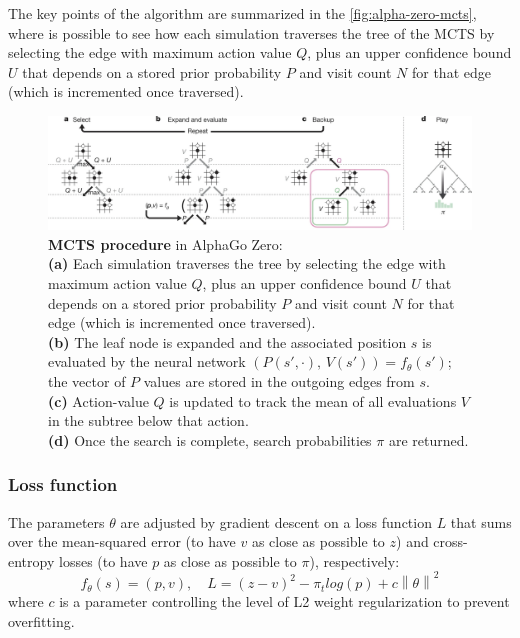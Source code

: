 \documentclass{article}
\newcommand{\norm}[1]{\left\lVert#1\right\rVert}
\begin{document}
The key points of the algorithm are summarized in the \autoref{fig:alpha-zero-mcts}, where is possible to see how each simulation traverses the tree of the MCTS by selecting the edge with maximum action value $Q$, plus an upper confidence bound $U$ that depends on a stored prior probability $P$ and visit count $N$ for that edge (which is incremented once traversed).
\begin{figure}[H]
	\centerline{\includegraphics[width=15cm]{alpha-zero-mcts.png}}
	\caption{\textbf{MCTS procedure} in AlphaGo Zero\cite{Silver_2016}:\\ \textbf{(a)} Each simulation traverses the tree by selecting the edge with maximum action value $Q$, plus an upper confidence bound $U$ that depends on a stored prior probability $P$ and visit count $N$ for that edge (which is incremented once traversed).\\ \textbf{(b)} The leaf node is expanded and the associated position $s$ is evaluated by the neural network $(P(s', \cdot), \, V(s')) = f_\theta(s')$; the vector of $P$ values are stored in the outgoing edges from $s$.\\ \textbf{(c)} Action-value $Q$ is updated to track the mean of all evaluations $V$ in the subtree below that action.\\ \textbf{(d)} Once the search is complete, search probabilities $\pi$ are returned.}
	\label{fig:alpha-zero-mcts}
\end{figure}

\subsubsection{Loss function}
The parameters $\theta$ are adjusted by gradient descent on a loss function $L$ that sums over the mean-squared error (to have $v$ as close as possible to $z$) and cross-entropy losses (to have $p$ as close as possible to $\pi$), respectively:
\begin{equation}\label{eq:loss_function_alphazero}
	f_\theta(s) = (p,v),\quad L = (z-v)^2 - \pi_t log(p) + c \norm{\theta}^2
\end{equation}
where $c$ is a parameter controlling the level of L2 weight regularization to prevent overfitting.
\end{document}

